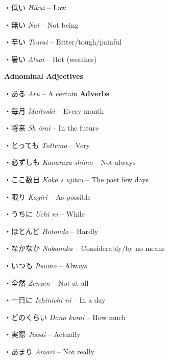 \par{・低い \emph{Hikui }– Low }
 
\par{・無い \emph{Nai }– Not being }
 
\par{・辛い \emph{Tsurai }– Bitter\slash tough\slash painful }
 
\par{・暑い \emph{Atsui }– Hot (weather) }
 
\par{\textbf{Adnominal Adjectives }}
 
\par{・ある \emph{Aru }– A certain }
    \textbf{Adverbs }
\par{・毎月 \emph{Maitsuki }– Every month }

\par{・将来 \emph{Sh }\emph{ōrai }– In the future }

\par{・とっても \emph{Tottemo }– Very }

\par{・必ずしも \emph{Kanarazu shimo }– Not always }

\par{・ここ数日 \emph{Koko s }\emph{ūjitsu }– The past few days }

\par{・限り \emph{Kagiri }– As possible }

\par{・うちに \emph{Uchi ni }– While }

\par{・ほとんど \emph{Hotondo }– Hardly }

\par{・なかなか \emph{Nakanaka }– Considerably\slash by no means }

\par{・いつも \emph{Itsumo }– Always }

\par{・全然 \emph{Zenzen }– Not at all }

\par{・一日に \emph{Ichinichi ni }– In a day }

\par{・どのくらい \emph{Dono kurai }– How much }

\par{・実際 \emph{Jissai }– Actually }

\par{・あまり \emph{Amari }– Not really }

